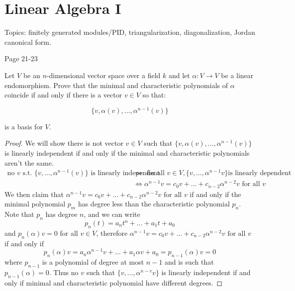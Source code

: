 \chapter{Linear Algebra I}
Topics: finitely generated modules/PID, triangularization, diagonalization, Jordan canonical form.

Page 21-23


\begin{prob}[F2018-Q1]
    Let \( V \) be an \( n \)-dimensional vector space over a field \( k \) and let \( \alpha: V \to V \) be a linear endomorphism.  
Prove that the minimal and characteristic polynomials of \( \alpha \) coincide if and only if there is a vector \( v \in V \) so that:  

\[\{v, \alpha(v), \ldots, \alpha^{n-1}(v)\}\]

is a basis for \( V \).
\end{prob}
\begin{proof}
    We will show there is not vector $v\in V$ such that $\{v, \alpha(v), \ldots, \alpha^{n-1}(v)\}$ is linearly independent if and only if the minimal and characteristic polynomials aren't the same. 
    \begin{align*}
        \text{no $v$ s.t. $\{v,\dots, \alpha^{n-1}(v)\}$ is linearly independent}&\iff \text{ for all } v\in V, \{v,\ldots, \alpha^{n-1}v\} \text{is linearly dependent}\\
        &\iff \alpha^{n-1}v=c_0v+\dots+c_{n-2}\alpha^{n-2}v \text{ for all } v
    \end{align*}
    We then claim that $\alpha^{n-1}v=c_0v+\dots+c_{n-2}\alpha^{n-2}v \text{ for all } v$ if and only if the minimal polynomial $p_m$ has degree less than the characteristic polynomial $p_n$. Note that $p_n$ has degree $n$, and we can write 
    \begin{equation*}
        p_n(t)=a_nt^n+\dots+a_1t+a_0
    \end{equation*}
    and $p_n(\alpha)v=0$ for all $v\in V$, therefore $\alpha^{n-1}v=c_0v+\dots+c_{n-2}\alpha^{n-2}v \text{ for all } v$ if and only if 
    \begin{equation*}
        p_n(\alpha)v=a_n\alpha^{n-1}v+\dots+a_1\alpha v+a_0=p_{n-1}(\alpha)v=0
    \end{equation*}
    where $p_{n-1}$ is a polynomial of degree at most $n-1$ and is such that $p_{n-1}(\alpha)=0$. Thus no $v$ such that $\{v,\dots,\alpha^{n-v}v\}$ is linearly independent if and only if minimal and characteristic polynomial have different degrees.
\end{proof}


